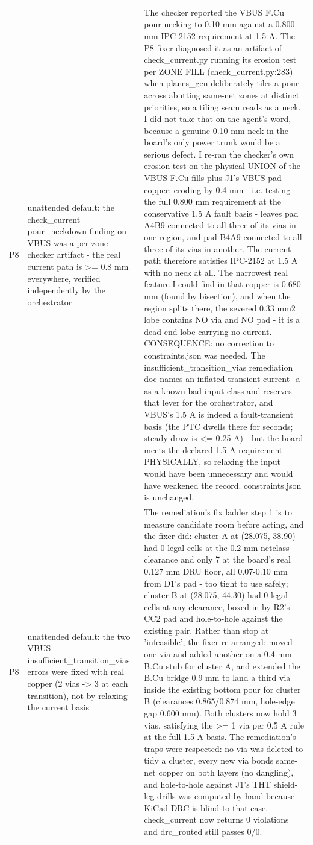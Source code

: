 \documentclass[11pt,a4paper]{article}
\begin{document}
{\begin{longtable}{lp{5.2cm}p{7.2cm}}
P8 & unattended default: the check\_current pour\_neckdown finding on VBUS was a per-zone checker artifact - the real current path is \textgreater{}= 0.8 mm everywhere, verified independently by the orchestrator & The checker reported the VBUS F.Cu pour necking to 0.10 mm against a 0.800 mm IPC-2152 requirement at 1.5 A. The P8 fixer diagnosed it as an artifact of check\_current.py running its erosion test per ZONE FILL (check\_current.py:283) when planes\_gen deliberately tiles a pour across abutting same-net zones at distinct priorities, so a tiling seam reads as a neck. I did not take that on the agent's word, because a genuine 0.10 mm neck in the board's only power trunk would be a serious defect. I re-ran the checker's own erosion test on the physical UNION of the VBUS F.Cu fills plus J1's VBUS pad copper: eroding by 0.4 mm - i.e. testing the full 0.800 mm requirement at the conservative 1.5 A fault basis - leaves pad A4B9 connected to all three of its vias in one region, and pad B4A9 connected to all three of its vias in another. The current path therefore satisfies IPC-2152 at 1.5 A with no neck at all. The narrowest real feature I could find in that copper is 0.680 mm (found by bisection), and when the region splits there, the severed 0.33 mm2 lobe contains NO via and NO pad - it is a dead-end lobe carrying no current. CONSEQUENCE: no correction to constraints.json was needed. The insufficient\_transition\_vias remediation doc names an inflated transient current\_a as a known bad-input class and reserves that lever for the orchestrator, and VBUS's 1.5 A is indeed a fault-transient basis (the PTC dwells there for seconds; steady draw is \textless{}= 0.25 A) - but the board meets the declared 1.5 A requirement PHYSICALLY, so relaxing the input would have been unnecessary and would have weakened the record. constraints.json is unchanged. \\
P8 & unattended default: the two VBUS insufficient\_transition\_vias errors were fixed with real copper (2 vias -\textgreater{} 3 at each transition), not by relaxing the current basis & The remediation's fix ladder step 1 is to measure candidate room before acting, and the fixer did: cluster A at (28.075, 38.90) had 0 legal cells at the 0.2 mm netclass clearance and only 7 at the board's real 0.127 mm DRU floor, all 0.07-0.10 mm from D1's pad - too tight to use safely; cluster B at (28.075, 44.30) had 0 legal cells at any clearance, boxed in by R2's CC2 pad and hole-to-hole against the existing pair. Rather than stop at 'infeasible', the fixer re-arranged: moved one via and added another on a 0.4 mm B.Cu stub for cluster A, and extended the B.Cu bridge 0.9 mm to land a third via inside the existing bottom pour for cluster B (clearances 0.865/0.874 mm, hole-edge gap 0.600 mm). Both clusters now hold 3 vias, satisfying the \textgreater{}= 1 via per 0.5 A rule at the full 1.5 A basis. The remediation's traps were respected: no via was deleted to tidy a cluster, every new via bonds same-net copper on both layers (no dangling), and hole-to-hole against J1's THT shield-leg drills was computed by hand because KiCad DRC is blind to that case. check\_current now returns 0 violations and drc\_routed still passes 0/0. \\

\end{longtable}}
\end{document}
